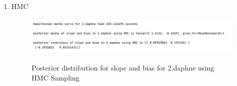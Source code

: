 \documentclass{article}
\begin{document}
\begin{enumerate}
\begin{enumerate}
\newpage
\item HMC

\begin{figure}[!ht]
	\centering
	\includegraphics[scale=0.5]{../figs/HMC/2_program_results}
\end{figure}

\begin{figure}[!htp] 
    \centering
    \hfill%
        \caption{Posterior distribution for slope and bias for 2.daphne using HMC Sampling}
\end{figure}


\end{enumerate}
\end{enumerate}
\end{document}
